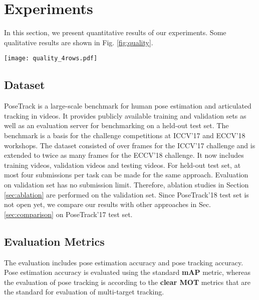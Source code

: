 \documentclass[10pt,twocolumn,letterpaper]{article}
\begin{document}
	
	
	
	
\section{Experiments}
	In this section, we present quantitative results of our experiments. Some qualitative results are shown in Fig. \ref{fig:quality}.
	
	\begin{figure*}
		\vspace{-.2in}
		\centering
\texttt{[image: quality\_4rows.pdf]}
		\caption{Qualitative evaluation results. Each person is visualized with a different color. Same color indicates identical IDs.} 
		\label{fig:quality}
		\vspace{-.1in}
	\end{figure*}
	
	
	\subsection{Dataset}
	
	PoseTrack \cite{andriluka2018posetrack} is a large-scale benchmark for human pose estimation and articulated tracking in videos. It provides publicly available training and validation sets as well as an evaluation server for benchmarking on a held-out test set. The benchmark is a basis for the challenge competitions at ICCV'17 \cite{PoseTrack17} and ECCV'18 \cite{PoseTrack18} workshops.
The dataset consisted of over  frames for the ICCV'17 challenge and is extended to twice as many frames for the ECCV'18 challenge. It now includes  training videos,  validation videos and  testing videos. 
For held-out test set, at most four submissions per task can be made for the same approach. 
Evaluation on validation set has no submission limit. Therefore, ablation studies in Section \ref{sec:ablation} are performed on the validation set.
	Since PoseTrack'18 test set is not open yet, we compare our results with other approaches in Sec. \ref{sec:comparison} on PoseTrack'17 test set. 
	
	\subsection{Evaluation  Metrics}
	The evaluation includes pose estimation accuracy and pose tracking
	accuracy. Pose estimation accuracy is evaluated using the standard \textbf{mAP} metric, whereas the evaluation of pose tracking is according to the \textbf{clear MOT} \cite{bernardin2008evaluating} metrics that are the standard for evaluation of multi-target tracking. 
\end{document}
